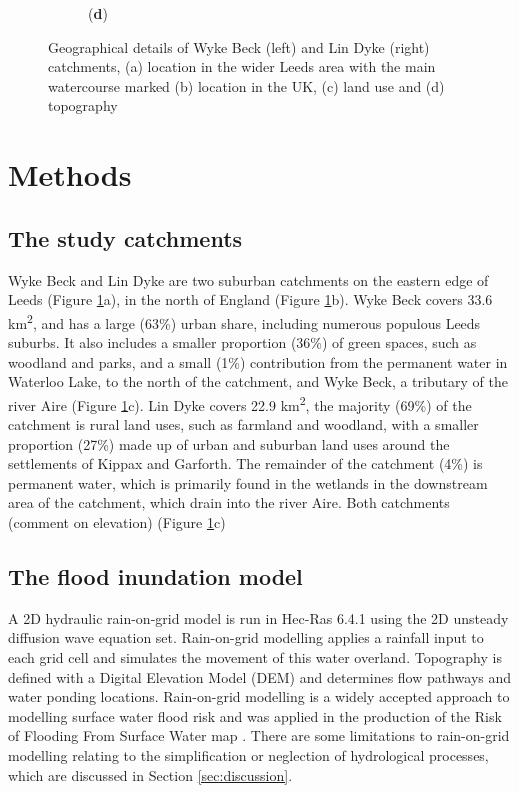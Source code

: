 \documentclass[APA,Times2COL]{WileyNJDv5}
\begin{document}
\begin{figure}[htbp!]
\begin{subfigure}[b]{.3\textwidth}
{  \parbox[b]{2.2in}{(\textbf{d})\\\rule{0ex}{1.5in}}}
\end{subfigure}
\caption{Geographical details of Wyke Beck (left) and Lin Dyke (right) catchments, (a) location in the wider Leeds area with the main watercourse marked (b) location in the UK, (c) land use and (d) topography} \label{fig:catchments}
\end{figure}


\section{Methods}\label{sec:methods}
\subsection{The study catchments}\label{subsec:model:catchments}
Wyke Beck and Lin Dyke are two suburban catchments on the eastern edge of Leeds (Figure \ref{fig:catchments}a), in the north of England (Figure \ref{fig:catchments}b). Wyke Beck covers 33.6 km\textsuperscript{2}, and has a large (63\%) urban share, including numerous populous Leeds suburbs. It also includes a smaller proportion (36\%) of green spaces, such as woodland and parks, and a small (1\%) contribution from the permanent water in Waterloo Lake, to the north of the catchment, and Wyke Beck, a tributary of the river Aire (Figure \ref{fig:catchments}c). Lin Dyke covers 22.9 km\textsuperscript{2}, the majority (69\%) of the catchment is rural land uses, such as farmland and woodland, with a smaller proportion (27\%) made up of urban and suburban land uses around the settlements of Kippax and Garforth. The remainder of the catchment (4\%) is permanent water, which is primarily found in the wetlands in the downstream area of the catchment, which drain into the river Aire. Both catchments (comment on elevation) (Figure \ref{fig:catchments}c)

\subsection{The flood inundation model}\label{subsec:model:catchments}

A 2D hydraulic rain-on-grid model is run in Hec-Ras 6.4.1 using the 2D unsteady diffusion wave equation set. Rain-on-grid modelling applies a rainfall input to each grid cell and simulates the movement of this water overland. Topography is defined with a Digital Elevation Model (DEM) and determines flow pathways and water ponding locations. Rain-on-grid modelling is a widely accepted approach to modelling surface water flood risk and was applied in the production of the Risk of Flooding From Surface Water map \citep{environment2019risk}. There are some limitations to rain-on-grid modelling relating to the simplification or neglection of hydrological processes, which are discussed in Section \ref{sec:discussion}.
\end{document}
